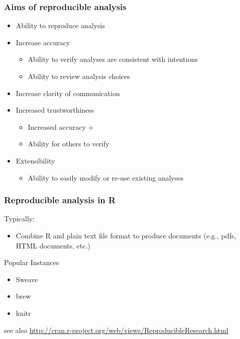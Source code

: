 \begin{frame}\frametitle{Aims of reproducible analysis}

\begin{itemize}
\item
  Ability to reproduce analysis
\item
  Increase accuracy

  \begin{itemize}
  \item
    Ability to verify analyses are consistent with intentions
  \item
    Ability to review analysis choices
  \end{itemize}
\item
  Increase clarity of communication
\item
  Increased trustworthiness

  \begin{itemize}
  \item
    Increased accuracy +
  \item
    Ability for others to verify
  \end{itemize}
\item
  Extensibility

  \begin{itemize}
  \item
    Ability to easily modify or re-use existing analyses
  \end{itemize}
\end{itemize}

\end{frame}

\begin{frame}\frametitle{Reproducible analysis in R}

\begin{block}{Typically:}

\begin{itemize}
\item
  Combine R and plain text file format to produce documents (e.g., pdfs,
  HTML documents, etc.)
\end{itemize}

\end{block}

\begin{block}{Popular Instances}

\begin{itemize}
\item
  Sweave
\item
  brew
\item
  knitr
\end{itemize}

\tiny{see also \url{http://cran.r-project.org/web/views/ReproducibleResearch.html}}

\end{block}

\end{frame}

